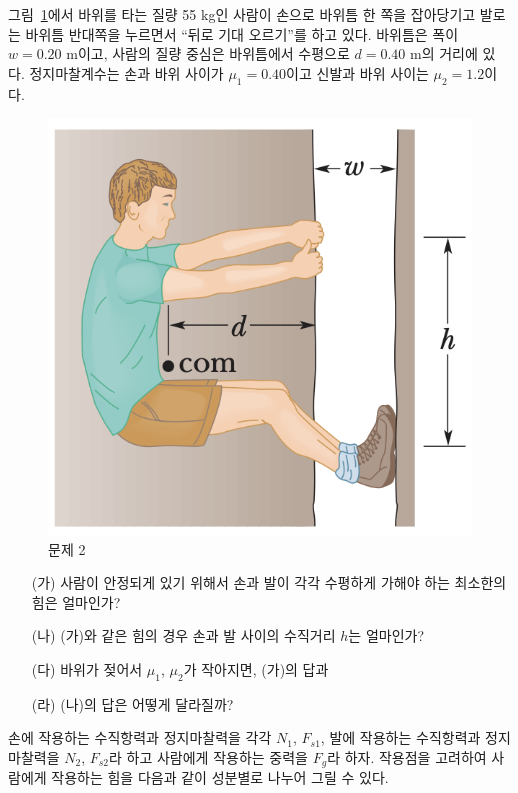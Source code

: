 \documentclass[floatfix,nofootinbib,superscriptaddress,fleqn]{revtex4-2}
\begin{document}
\vspace{0.5cm}

그림~\ref{fig:2}에서 바위를 타는 질량 55 kg인 사람이 손으로 바위틈 한
쪽을 잡아당기고 발로는 바위틈 반대쪽을 누르면서 ``뒤로 기대 오르기''를
하고 있다. 바위틈은 폭이 $w=0.20$ m이고, 사람의 질량 중심은 바위틈에서
수평으로 $d=0.40$ m의 거리에 있다. 정지마찰계수는 손과 바위 사이가
$\mu_1=0.40$이고 신발과 바위 사이는 $\mu_2=1.2$이다.  
\begin{figure}[ht]
  \centering
\includegraphics[scale=0.6]{Qfig15-2-20220502.png}
  \caption{문제 2}
  \label{fig:2}
\end{figure}
\begin{itemize}
\item[(가)] 사람이 안정되게 있기 위해서 손과 발이 각각 수평하게 가해야
  하는 최소한의 힘은 얼마인가?
\item[(나)] (가)와 같은 힘의 경우 손과 발 사이의 수직거리 $h$는
  얼마인가?
\item[(다)]  바위가 젖어서 $\mu_1$, $\mu_2$가 작아지면, (가)의
  답과
\item[(라)] (나)의 답은 어떻게 달라질까?
\end{itemize}

 손에 작용하는 수직항력과 정지마찰력을 각각 
$N_1$, $F_{s1}$,
발에 작용하는 수직항력과 정지마찰력을 $N_2$, $F_{s2}$라 하고 
사람에게 작용하는 중력을 
$F_g$라 하자. 작용점을 고려하여 사람에게 작용하는 힘을 
다음과 같이 성분별로 나누어 그릴 수 있다.
\end{document}

